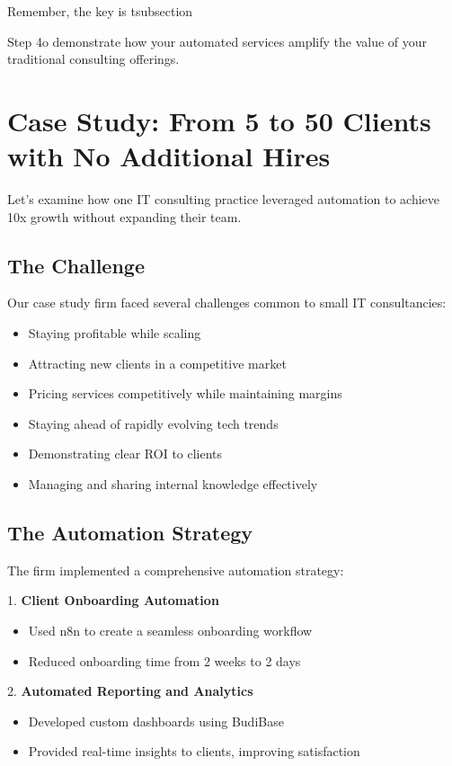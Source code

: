 Remember, the key is tsubsection{Step 4o demonstrate how your automated services amplify the value of your traditional consulting offerings.

\section{Case Study: From 5 to 50 Clients with No Additional Hires}

Let's examine how one IT consulting practice leveraged automation to achieve 10x growth without expanding their team.

\subsection{The Challenge}

Our case study firm faced several challenges common to small IT consultancies:
\begin{itemize}
    \item Staying profitable while scaling
    \item Attracting new clients in a competitive market
    \item Pricing services competitively while maintaining margins
    \item Staying ahead of rapidly evolving tech trends
    \item Demonstrating clear ROI to clients
    \item Managing and sharing internal knowledge effectively
\end{itemize}

\subsection{The Automation Strategy}

The firm implemented a comprehensive automation strategy:

1. \textbf{Client Onboarding Automation}
\begin{itemize}
    \item Used n8n to create a seamless onboarding workflow
    \item Reduced onboarding time from 2 weeks to 2 days
\end{itemize}

2. \textbf{Automated Reporting and Analytics}
\begin{itemize}
    \item Developed custom dashboards using BudiBase
    \item Provided real-time insights to clients, improving satisfaction
\end{itemize}

}
